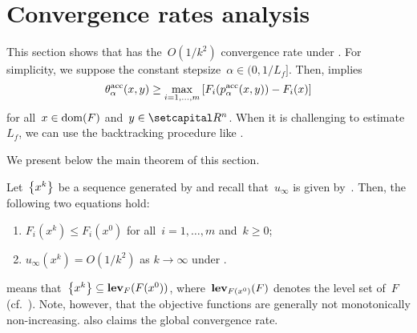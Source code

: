 \documentclass[../main]{subfiles}
\begin{document}
\section{Convergence rates analysis} 
This section shows that  has the~$O(1 / k^2)$ convergence rate under .
For simplicity, we suppose the constant stepsize~$\alpha \in (0, 1 / L_f]$.
Then,  implies
\begin{equation} \label{eq:acc_pgm_sdc}
    \theta^\acc_\alpha(x, y) \ge \max_{i = 1, \dots, m}\left[ F_i(p^\acc_\alpha(x, y)) - F_i(x) \right]
\end{equation}
for all~$x \in \dom(F)$ and~$y \in \setR^n$.
When it is challenging to estimate~$L_f$, we can use the backtracking procedure like .

We present below the main theorem of this section.
\begin{theorem} 
    Let~$\set*{x^k}$ be a sequence generated by  and recall that~$u_\infty$ is given by~.
    Then, the following two equations hold:
    \begin{enumerate}
    \item $F_i\left(x^k\right) \le F_i(x^0)$ for all~$i = 1, \dots, m$ and~$k \ge 0$; 
    \item $u_\infty\left(x^k\right) = O(1 / k^2)$ as $k \to \infty$ under . 
    \end{enumerate}
\end{theorem}
 means that~$\set*{x^k} \subseteq \level_F(F(x^0))$, where~$\level_{F(x^0)}(F)$ denotes the level set of~$F$ (cf.~).
Note, however, that the objective functions are generally not monotonically non-increasing.
 also claims the global convergence rate.
\end{document}
